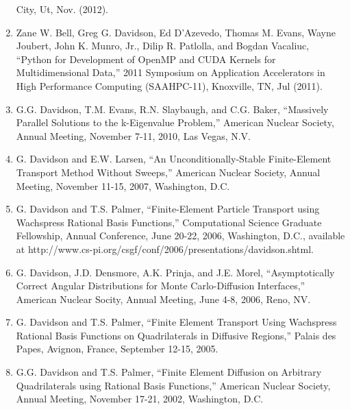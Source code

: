 \documentclass[letterpaper,11pt]{article}
\begin{document}
\begin{enumerate}
    City, Ut, Nov. (2012).
  \item Zane W. Bell, Greg G. Davidson, Ed D'Azevedo, Thomas
    M. Evans, Wayne Joubert, John K. Munro, Jr., Dilip R. Patlolla,
    and Bogdan Vacaliuc, ``Python for Development of OpenMP and CUDA
    Kernels for Multidimensional Data,'' 2011 Symposium on
    Application Accelerators in High Performance Computing
    (SAAHPC-11), Knoxville, TN, Jul (2011).
  \item G.G. Davidson, T.M. Evans, R.N. Slaybaugh, and C.G. Baker,
    ``Massively Parallel Solutions to the k-Eigenvalue Problem,''
    American Nuclear Society, Annual Meeting, November 7-11, 2010, Las
    Vegas, N.V.
  \item G. Davidson and E.W. Larsen, ``An Unconditionally-Stable
    Finite-Element Transport Method Without Sweeps,'' American Nuclear
    Society, Annual Meeting, November 11-15, 2007, Washington, D.C.
  \item G. Davidson and T.S. Palmer, ``Finite-Element Particle
    Transport using Wachspress Rational Basis Functions,''
    Computational Science Graduate Fellowship, Annual Conference, June
    20-22, 2006, Washington, D.C., available at
    http://www.cs-pi.org/csgf/conf/2006/presentations/davidson.shtml.
  \item G. Davidson, J.D. Densmore, A.K. Prinja, and J.E. Morel,
    ``Asymptotically Correct Angular Distributions for Monte
    Carlo-Diffusion Interfaces,'' American Nuclear Socity, Annual
    Meeting, June 4-8, 2006, Reno, NV.
  \item G. Davidson and T.S. Palmer, ``Finite Element Transport Using
    Wachspress Rational Basis Functions on Quadrilaterals in Diffusive
    Regions,'' Palais des Papes, Avignon, France, September 12-15,
    2005.
  \item G.G. Davidson and T.S. Palmer, ``Finite Element Diffusion on
    Arbitrary Quadrilaterals using Rational Basis Functions,'' American
    Nuclear Society, Annual Meeting, November 17-21, 2002, Washington,
    D.C.
\end{enumerate}

\end{document}
